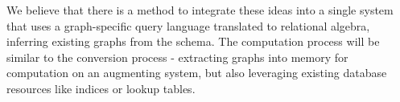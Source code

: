 \documentclass[11pt,letterpaper]{article}
\begin{document}
We believe that there is a method to integrate these ideas into a single system that uses a graph-specific query language translated to relational algebra, inferring existing graphs from the schema. The computation process will be similar to the conversion process - extracting graphs into memory for computation on an augmenting system, but also leveraging existing database resources like indices or lookup tables.

\clearpage



%
%
%
%
%
%
%
%
\end{document}
